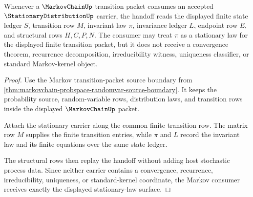\begin{theorem}
\label{thm:stationary-distribution-markov-consumer-handoff}
Whenever a $\MarkovChainUp$ transition packet consumes an accepted
$\StationaryDistributionUp$ carrier, the handoff reads the displayed finite
state ledger $S$, transition row $M$, invariant law $\pi$, invariance ledger
$L$, endpoint row $E$, and structural rows $H,C,P,N$. The consumer may treat
$\pi$ as a stationary law for the displayed finite transition packet, but it
does not receive a convergence theorem, recurrence decomposition,
irreducibility witness, uniqueness classifier, or standard Markov-kernel
object.
\end{theorem}
\begin{proof}
Use the Markov transition-packet source boundary from
\autoref{thm:markovchain-probspace-randomvar-source-boundary}. It keeps the
probability source, random-variable rows, distribution laws, and transition
rows inside the displayed $\MarkovChainUp$ packet.

Attach the stationary carrier along the common finite transition row. The
matrix row $M$ supplies the finite transition entries, while $\pi$ and $L$
record the invariant law and its finite equations over the same state ledger.

The structural rows then replay the handoff without adding host stochastic
process data. Since neither carrier contains a convergence, recurrence,
irreducibility, uniqueness, or standard-kernel coordinate, the Markov consumer
receives exactly the displayed stationary-law surface.
\end{proof}




